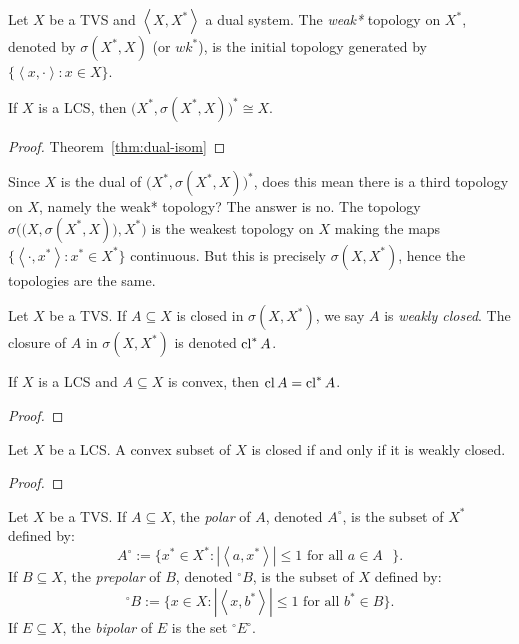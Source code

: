 \begin{definition}
	Let $X$ be a TVS and $\left<X,X^\ast \right>$ a dual system. The \emph{weak*} topology on $X^\ast$, denoted by $\sigma(X^\ast,X)$ (or $wk^\ast$), is the initial topology generated by $\{\left<x,\cdot\right> : x \in X \}$.
\end{definition}

\begin{theorem}
	If $X$ is a LCS, then $\bigl( X^\ast, \sigma(X^\ast,X) \bigr)^\ast \cong X$.
\end{theorem}	
	\begin{proof}
		Theorem~\ref{thm:dual-isom}
	\end{proof}

\begin{remark}
	Since $X$ is the dual of $\bigl( X^\ast,\sigma(X^\ast,X) \bigr)^\ast$, does this mean there is a third topology on $X$, namely the weak* topology? The answer is no. The topology $\sigma\bigl( \bigl( X,\sigma(X^\ast,X) \bigr), X^\ast \bigr)$ is the weakest topology on $X$ making the maps $\{\left<\cdot,x^\ast \right>: x^\ast \in X^\ast\}$ continuous. But this is precisely $\sigma(X,X^\ast)$, hence the topologies are the same.
\end{remark}

\begin{definition}
	Let $X$ be a TVS. If $A \subseteq X$ is closed in $\sigma(X,X^\ast)$, we say $A$ is \emph{weakly closed}. The closure of $A$ in $\sigma(X,X^\ast)$ is denoted $\operatorname{cl}^\ast A$.
\end{definition}

\begin{proposition}
	If $X$ is a LCS and $A \subseteq X$ is convex, then $\operatorname{cl} A = \operatorname{cl}^\ast A$.
\end{proposition}
	{\color{red}
	\begin{proof}
			
	\end{proof}}

\begin{corollary}
	Let $X$ be a LCS. A convex subset of $X$ is closed if and only if it is weakly closed.
\end{corollary}
	{\color{red}
	\begin{proof}
			
	\end{proof}}

\begin{definition}
	Let $X$ be a TVS. If $A \subseteq X$, the \emph{polar} of $A$, denoted $A^\circ$, is the subset of $X^\ast$ defined by: $$A^\circ := \{x^\ast \in X^\ast : |\left<a,x^\ast \right>| \leq 1 \text{ for all $a \in A$ }\}.$$ If $B \subseteq X$, the \emph{prepolar} of $B$, denoted $^\circ B$, is the subset of $X$ defined by: $$^\circ B := \{x \in X : |\left<x,b^\ast \right>| \leq 1 \text{ for all $b^\ast \in B$}\}. $$ If $E \subseteq X$, the \emph{bipolar} of $E$ is the set $^\circ E ^\circ$.
\end{definition}

